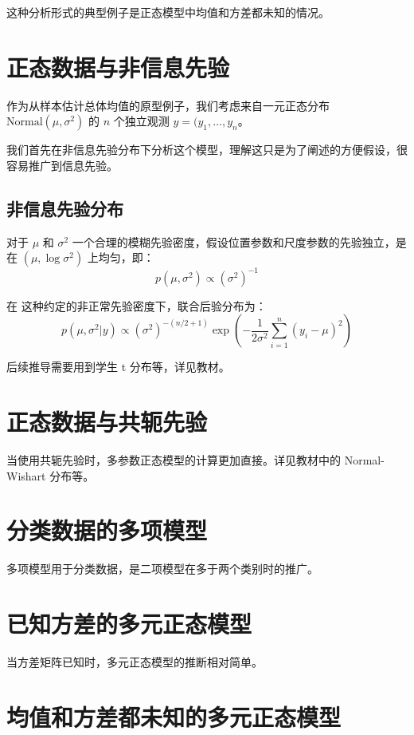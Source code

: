 这种分析形式的典型例子是正态模型中均值和方差都未知的情况。

\section{正态数据与非信息先验}

作为从样本估计总体均值的原型例子，我们考虑来自一元正态分布 $\text{Normal}(\mu, \sigma^2)$ 的 $n$ 个独立观测 $y = (y_1, \ldots, y_n$。

我们首先在非信息先验分布下分析这个模型，理解这只是为了阐述的方便假设，很容易推广到信息先验。

\subsection{非信息先验分布}

对于 $\mu$ 和 $\sigma^2$ 一个合理的模糊先验密度，假设位置参数和尺度参数的先验独立，是在 $(\mu, \log \sigma^2)$ 上均匀，即：
\[
p(\mu, \sigma^2) \propto (\sigma^2)^{-1}
\]

在 这种约定的非正常先验密度下，联合后验分布为：
\[
p(\mu, \sigma^2 | y) \propto (\sigma^2)^{-(n/2+1)} \exp\left(-\frac{1}{2\sigma^2} \sum_{i=1}^n (y_i - \mu)^2\right)
\]

后续推导需要用到学生 t 分布等，详见教材。

\section{正态数据与共轭先验}

当使用共轭先验时，多参数正态模型的计算更加直接。详见教材中的 Normal-Wishart 分布等。

\section{分类数据的多项模型}

多项模型用于分类数据，是二项模型在多于两个类别时的推广。

\section{已知方差的多元正态模型}

当方差矩阵已知时，多元正态模型的推断相对简单。

\section{均值和方差都未知的多元正态模型}

